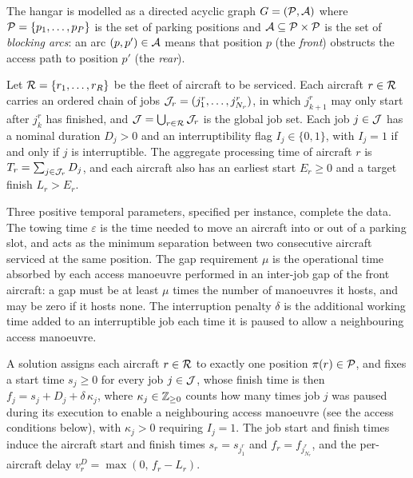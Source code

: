 The hangar is modelled as a directed acyclic graph $G = (\mathcal{P}, \mathcal{A})$
where $\mathcal{P} = \{p_1, \dots, p_P\}$ is the set of parking positions and
$\mathcal{A} \subseteq \mathcal{P} \times \mathcal{P}$ is the set of \emph{blocking
arcs}: an arc $(p, p') \in \mathcal{A}$ means that position $p$ (the
\emph{front}) obstructs the access path to position $p'$ (the
\emph{rear}).

Let $\mathcal{R} = \{r_1, \dots, r_R\}$ be the fleet of aircraft to be
serviced.  Each aircraft $r \in \mathcal{R}$ carries an ordered chain of jobs
$\mathcal{J}_r = (j^r_1, \ldots, j^r_{N_r})$, in which $j^r_{k+1}$ may only
start after $j^r_k$ has finished, and
$\mathcal{J} = \bigcup_{r \in \mathcal{R}} \mathcal{J}_r$ is the global job set.  Each
job $j \in \mathcal{J}$ has a nominal duration $D_j > 0$ and an
interruptibility flag $I_j \in \{0, 1\}$, with $I_j = 1$ if and only if
$j$ is interruptible.  The aggregate processing time of aircraft $r$ is
$T_r = \sum_{j \in \mathcal{J}_r} D_j$, and each aircraft also has an earliest
start $E_r \ge 0$ and a target finish $L_r > E_r$.

Three positive temporal parameters, specified per instance, complete
the data.  The towing time $\varepsilon$ is the time needed to move an
aircraft into or out of a parking slot, and acts as the minimum
separation between two consecutive aircraft serviced at the same
position.  The gap requirement $\mu$ is the operational time absorbed by
each access manoeuvre performed in an inter-job gap of the front
aircraft: a gap must be at least $\mu$ times the number of manoeuvres
it hosts, and may be zero if it hosts none.  The interruption penalty
$\delta$ is the additional working time added to an interruptible job
each time it is paused to allow a neighbouring access manoeuvre.


A solution assigns each aircraft $r \in \mathcal{R}$ to exactly one position
$\pi(r) \in \mathcal{P}$, and fixes a start time $s_j \ge 0$ for every job
$j \in \mathcal{J}$, whose finish time is then
$f_j = s_j + D_j + \delta\, \kappa_j$, where $\kappa_j \in \mathbb{Z}_{\geq 0}$ counts
how many times job $j$ was paused during its execution to enable a
neighbouring access manoeuvre (see the access conditions below), with
$\kappa_j > 0$ requiring $I_j = 1$.  The job start and finish times
induce the aircraft start and finish times $s_r = s_{j^r_1}$ and
$f_r = f_{j^r_{N_r}}$, and the per-aircraft delay
$v^D_r = \max(0,\, f_r - L_r)$.

